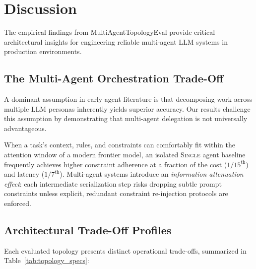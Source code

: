 \section{Discussion}
\label{sec:discussion}

The empirical findings from MultiAgentTopologyEval provide critical architectural insights for engineering reliable multi-agent LLM systems in production environments.

\subsection{The Multi-Agent Orchestration Trade-Off}
A dominant assumption in early agent literature is that decomposing work across multiple LLM personas inherently yields superior accuracy. Our results challenge this assumption by demonstrating that multi-agent delegation is not universally advantageous. 

When a task's context, rules, and constraints can comfortably fit within the attention window of a modern frontier model, an isolated \textsc{Single} agent baseline frequently achieves higher constraint adherence at a fraction of the cost ($1/15^{\text{th}}$) and latency ($1/7^{\text{th}}$). Multi-agent systems introduce an \textit{information attenuation effect}: each intermediate serialization step risks dropping subtle prompt constraints unless explicit, redundant constraint re-injection protocols are enforced.

\subsection{Architectural Trade-Off Profiles}
Each evaluated topology presents distinct operational trade-offs, summarized in Table~\ref{tab:topology_specs}:

